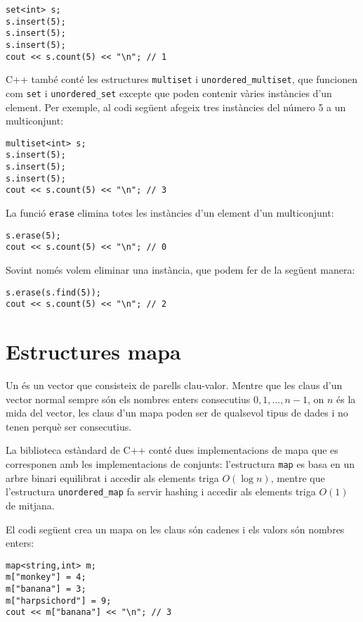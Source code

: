\begin{lstlisting}
set<int> s;
s.insert(5);
s.insert(5);
s.insert(5);
cout << s.count(5) << "\n"; // 1
\end{lstlisting}

C++ també conté les estructures
\texttt{multiset} i \texttt{unordered\_multiset},
que funcionen com \texttt{set}
i \texttt{unordered\_set}
excepte que poden contenir vàries instàncies d'un element.
Per exemple, al codi següent afegeix tres instàncies
del número 5 a un multiconjunt:

\begin{lstlisting}
multiset<int> s;
s.insert(5);
s.insert(5);
s.insert(5);
cout << s.count(5) << "\n"; // 3
\end{lstlisting}
La funció \texttt{erase} elimina
totes les instàncies d'un element
d'un multiconjunt:
\begin{lstlisting}
s.erase(5);
cout << s.count(5) << "\n"; // 0
\end{lstlisting}
Sovint només volem eliminar una instància,
que podem fer de la següent manera:
\begin{lstlisting}
s.erase(s.find(5));
cout << s.count(5) << "\n"; // 2
\end{lstlisting}

\section{Estructures mapa}


Un  és un vector que consisteix
de parells clau-valor.
Mentre que les claus d'un vector normal sempre
són els nombres enters consecutius $0,1,\ldots,n-1$,
on $n$ és la mida del vector,
les claus d'un mapa poden ser de qualsevol tipus de dades i
no tenen perquè ser consecutius.

La biblioteca estàndard de C++ conté dues implementacions
de mapa que es corresponen amb les implementacions de
conjunts: l'estructura
\texttt{map} es basa en un arbre binari
equilibrat i accedir als elements triga $O(\log n)$,
mentre que l'estructura
\texttt{unordered\_map} fa servir hashing
i accedir als elements triga $O(1)$ de mitjana.

El codi següent crea un mapa
on les claus són cadenes i els valors són nombres enters:

\begin{lstlisting}
map<string,int> m;
m["monkey"] = 4;
m["banana"] = 3;
m["harpsichord"] = 9;
cout << m["banana"] << "\n"; // 3
\end{lstlisting}

